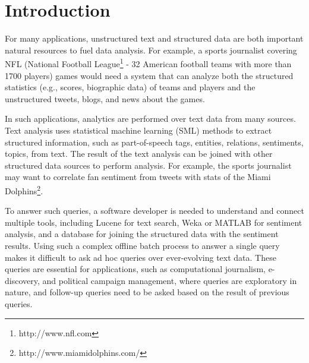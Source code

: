 
\section{Introduction}

For many
applications, unstructured text and structured data are both
important natural resources to fuel data analysis. For example, a
sports journalist covering NFL (National Football
League\footnote{http://www.nfl.com} - 32 American football teams with
more than 1700 players) games would need a system that can analyze both the
structured statistics (e.g., scores, biographic data) of teams and players and the
unstructured tweets, blogs, and news about the games.

In such applications, analytics are performed over text data
from many sources. Text analysis uses 
statistical machine learning (SML) methods to extract structured
information, such as part-of-speech tags, entities, relations, 
sentiments, topics, from
text. The result of the text analysis can be joined with other
structured data sources to perform analysis. For example, the sports
journalist may want to correlate fan sentiment from tweets 
with stats 
of the Miami Dolphins\footnote{http://www.miamidolphins.com/}.

To answer such queries, a software
developer is needed to understand and connect multiple tools,
including Lucene for text search, Weka or MATLAB for sentiment
analysis, and a database for joining the structured data with the
sentiment results. Using such a complex offline batch process to 
answer a single query
makes it difficult to ask ad hoc queries over ever-evolving text data. 
These queries are essential for applications, such as computational journalism,
e-discovery, and political campaign management, where queries are
exploratory in nature, and follow-up queries need to be asked based
on the result of previous queries.


